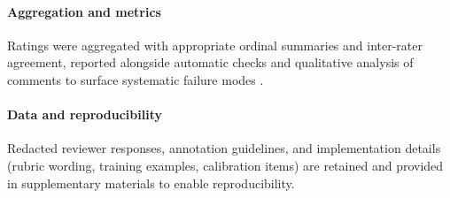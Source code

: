\paragraph{Aggregation and metrics} Ratings were aggregated with appropriate ordinal summaries and inter-rater agreement, reported alongside automatic checks and qualitative analysis of comments to surface systematic failure modes \cite{web_ray_2019_can_you_explain_that_lucid_explanations_help_hum}.

\paragraph{Data and reproducibility} Redacted reviewer responses, annotation guidelines, and implementation details (rubric wording, training examples, calibration items) are retained and provided in supplementary materials to enable reproducibility.